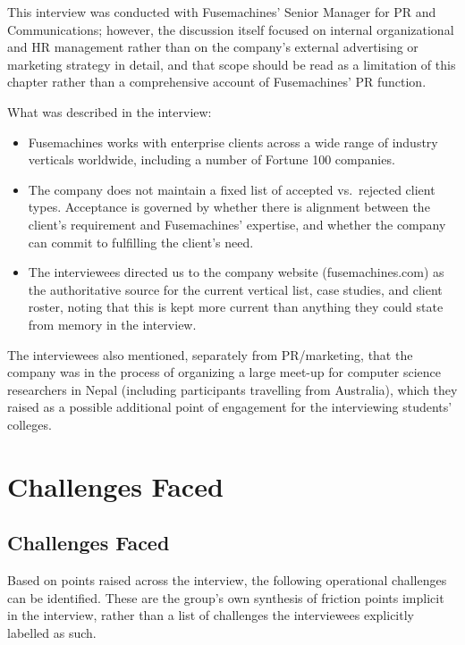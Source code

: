 \documentclass[12pt,a4paper]{report}
\begin{document}
This interview was conducted with Fusemachines' Senior Manager for PR and Communications; however, the discussion itself focused on internal organizational and HR management rather than on the company's external advertising or marketing strategy in detail, and that scope should be read as a limitation of this chapter rather than a comprehensive account of Fusemachines' PR function.

What was described in the interview:
\begin{itemize}[leftmargin=1.5cm]
  \item Fusemachines works with enterprise clients across a wide range of industry verticals worldwide, including a number of Fortune 100 companies.
  \item The company does not maintain a fixed list of accepted vs.\ rejected client types. Acceptance is governed by whether there is alignment between the client's requirement and Fusemachines' expertise, and whether the company can commit to fulfilling the client's need.
  \item The interviewees directed us to the company website (fusemachines.com) as the authoritative source for the current vertical list, case studies, and client roster, noting that this is kept more current than anything they could state from memory in the interview.
\end{itemize}

The interviewees also mentioned, separately from PR/marketing, that the company was in the process of organizing a large meet-up for computer science researchers in Nepal (including participants travelling from Australia), which they raised as a possible additional point of engagement for the interviewing students' colleges.

\chapter{Challenges Faced}

\section{Challenges Faced}

Based on points raised across the interview, the following operational challenges can be identified. These are the group's own synthesis of friction points implicit in the interview, rather than a list of challenges the interviewees explicitly labelled as such.
\end{document}
